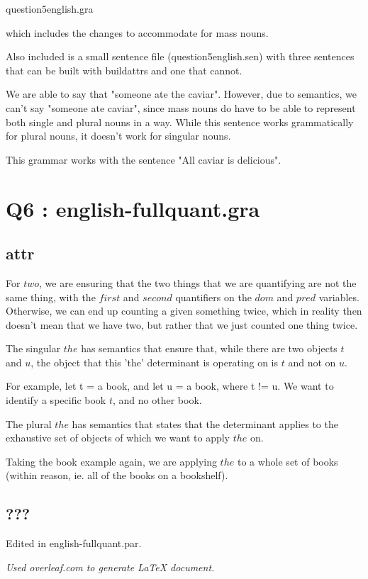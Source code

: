 \documentclass[12pt, letterpaper]{article}
\begin{document}
question5english.gra

which includes the changes to accommodate for mass nouns.

Also included is a small sentence file (question5english.sen) with three sentences that can be built with buildattrs and one that cannot. 

We are able to say that "someone ate the caviar". However, due to semantics, we can't say "someone ate caviar", since mass nouns do have to be able to represent both single and plural nouns in a way. While this sentence works grammatically for plural nouns, it doesn't work for singular nouns. 

This grammar works with the sentence "All caviar is delicious".

\section{Q6 : english-fullquant.gra}
\subsection{attr}


For $two$, we are ensuring that the two things that we are quantifying are not the same thing, with the $first$ and $second$ quantifiers on the $dom$ and $pred$ variables. Otherwise, we can end up counting a given something twice, which in reality then doesn't mean that we have two, but rather that we just counted one thing twice. 


The singular $the$ has semantics that ensure that, while there are two objects $t$ and $u$, the object that this 'the' determinant is operating on is $t$ and not on $u$. 

For example, let t = a book, and let u = a book, where t != u. We want to identify a specific book $t$, and no other book. 


The plural $the$ has semantics that states that the determinant applies to the exhaustive set of objects of which we want to apply $the$ on. 

Taking the book example again, we are applying $the$ to a whole set of books (within reason, ie. all of the books on a bookshelf). 

\subsection{???}
Edited in english-fullquant.par. %

\begin{center}
\textit{Used overleaf.com to generate LaTeX document.}
\end{center}
\end{document}
